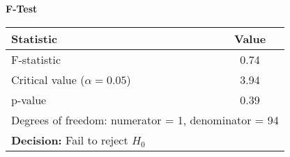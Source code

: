 \noindent\textbf{F-Test}\\
\begin{tabular}{lc}
\hline
Statistic & Value \\
\hline
F-statistic & 0.74 \\
Critical value ($\alpha=0.05$) & 3.94 \\
p-value & 0.39 \\
\hline
\multicolumn{2}{l}{Degrees of freedom: numerator = 1, denominator = 94} \\
\multicolumn{2}{l}{\textbf{Decision:} Fail to reject $H_0$} \\
\end{tabular}

